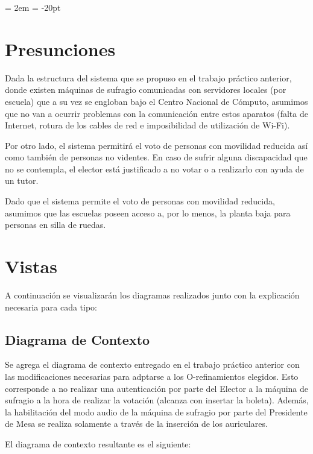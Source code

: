 \documentclass[spanish, 10pt,a4paper]{article}
\numberwithin{equation}{section} %
\begin{document}
{ \oddsidemargin = 2em
	\headheight = -20pt
	\maketitle
}
	\tableofcontents
	\newpage



\section{Presunciones}
	Dada la estructura del sistema que se propuso en el trabajo práctico anterior, donde existen máquinas de sufragio comunicadas con servidores locales (por escuela) que a su vez se engloban bajo el Centro Nacional de Cómputo, asumimos que no van a ocurrir problemas con la comunicación entre estos aparatos (falta de Internet, rotura de los cables de red e imposibilidad de utilización de Wi-Fi). 
\par Por otro lado, el sistema permitirá el voto de personas con movilidad reducida así como también de personas no videntes. En caso de sufrir alguna discapacidad que no se contempla, el elector está justificado a no votar o a realizarlo con ayuda de un tutor.
\par Dado que el sistema permite el voto de personas con movilidad reducida, asumimos que las escuelas poseen acceso a, por lo menos, la planta baja para personas en silla de ruedas. 

\section{Vistas}
	A continuación se visualizarán los diagramas realizados junto con la explicación necesaria para cada tipo:
\subsection{Diagrama de Contexto}
	Se agrega el diagrama de contexto entregado en el trabajo práctico anterior con las modificaciones necesarias para adptarse a los O-refinamientos elegidos. Esto corresponde a no realizar una autenticación por parte del Elector a la máquina de sufragio a la hora de realizar la votación (alcanza con insertar la boleta). Además, la habilitación del modo audio de la máquina de sufragio por parte del Presidente de Mesa se realiza solamente a través de la inserción de los auriculares. 
\par El diagrama de contexto resultante es el siguiente:
\end{document}
